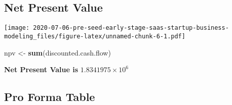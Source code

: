 \documentclass[
]{article}
\newenvironment{Shaded}{\begin{snugshade}}{\end{snugshade}}
\newcommand{\DataTypeTok}[1]{\textcolor[rgb]{0.13,0.29,0.53}{#1}}
\newcommand{\DecValTok}[1]{\textcolor[rgb]{0.00,0.00,0.81}{#1}}
\newcommand{\KeywordTok}[1]{\textcolor[rgb]{0.13,0.29,0.53}{\textbf{#1}}}
\newcommand{\NormalTok}[1]{#1}
\newcommand{\OperatorTok}[1]{\textcolor[rgb]{0.81,0.36,0.00}{\textbf{#1}}}
\newcommand{\StringTok}[1]{\textcolor[rgb]{0.31,0.60,0.02}{#1}}
\begin{document}
\hypertarget{net-present-value}{%
\subsection{Net Present Value}\label{net-present-value}}

\begin{Shaded}
\end{Shaded}

\texttt{[image: 2020-07-06-pre-seed-early-stage-saas-startup-business-modeling\_files/figure-latex/unnamed-chunk-6-1.pdf]}

\begin{Shaded}
\begin{Highlighting}[]
\NormalTok{npv <-}\StringTok{ }\KeywordTok{sum}\NormalTok{(discounted.cash.flow)}
\end{Highlighting}
\end{Shaded}

\textbf{Net Present Value is} \ensuremath{1.8341975\times 10^{6}}

\hypertarget{pro-forma-table-1}{%
\subsection{Pro Forma Table}\label{pro-forma-table-1}}
\end{document}
